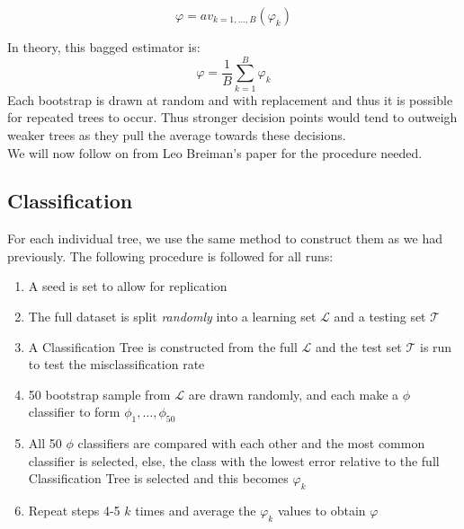 \documentclass[11pt,a4paper]{report}
\begin{document}
\[ \varphi = av_{k = 1,\dots,B} (\varphi_k) \]

In theory, this bagged estimator is:
\begin{equation}
    \varphi = \frac{1}{B} \sum_{k=1}^{B} \varphi_k
\end{equation}
Each bootstrap is drawn at random and with replacement and thus it is possible for repeated trees to occur. 
Thus stronger decision points would tend to outweigh weaker trees as they pull the average towards these decisions.
\medskip\\
We will now follow on from Leo Breiman's paper \cite{bagging} for the procedure needed.

\subsection{Classification}
For each individual tree, we use the same method to construct them as we had previously.
The following procedure is followed for all runs:
\begin{enumerate}
    \item A seed is set to allow for replication
    
    \item The full dataset is split \textit{randomly} into a learning set $\mathcal{L}$ and a testing set $\mathcal{T}$
    
    \item A Classification Tree is constructed from the full $\mathcal{L}$ and the test set $\mathcal{T}$ is run to test the misclassification rate
    
    \item 50 bootstrap sample from $\mathcal{L}$ are drawn randomly, and each make a $\phi$ classifier to form $\phi_1, \dots, \phi_{50}$
    
    \item All 50 $\phi$ classifiers are compared with each other and the most common classifier is selected, else, the class with the lowest error relative to the full Classification Tree is selected and this becomes $\varphi_k$
    
    \item Repeat steps 4-5 $k$ times and average the $\varphi_k$ values to obtain $\varphi$
\end{enumerate}
\end{document}
